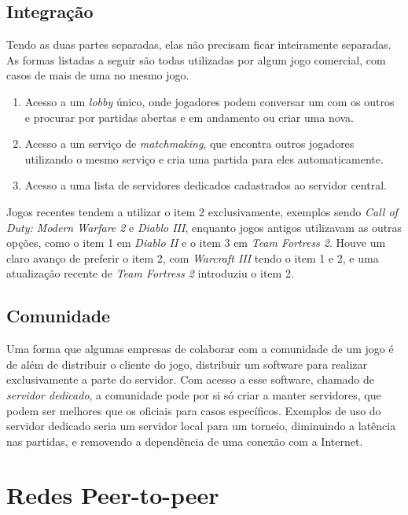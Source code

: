   \subsection{Integração}
    Tendo as duas partes separadas, elas não precisam ficar inteiramente separadas. As formas
    listadas a seguir são todas utilizadas por algum jogo comercial, com casos de mais de uma no
    mesmo jogo.
    
    \begin{enumerate}
      \item Acesso a um \textit{lobby} único, onde jogadores podem conversar um com os outros e
        procurar por partidas abertas e em andamento ou criar uma nova.
      \item Acesso a um serviço de \textit{matchmaking}, que encontra outros jogadores utilizando
        o mesmo serviço e cria uma partida para eles automaticamente.
      \item Acesso a uma lista de servidores dedicados cadastrados ao servidor central.
    \end{enumerate}
    
    Jogos recentes tendem a utilizar o item 2 exclusivamente, exemplos sendo \textit{Call of Duty:
    Modern Warfare 2} e \textit{Diablo III}, enquanto jogos antigos utilizavam as outras opções,
    como o item 1 em \textit{Diablo II} e o item 3 em \textit{Team Fortress 2}. Houve um claro
    avanço de preferir o item 2, com \textit{Warcraft III} tendo o item 1 e 2, e uma atualização
    recente de \textit{Team Fortress 2} introduziu o item 2.
    
  \subsection{Comunidade}
    Uma forma que algumas empresas de colaborar com a comunidade de um jogo é de além de
    distribuir o cliente do jogo, distribuir um software para realizar exclusivamente a parte
    do servidor. Com acesso a esse software, chamado de \textit{servidor dedicado}, a comunidade
    pode por si só criar a manter servidores, que podem ser melhores que os oficiais para casos
    específicos. Exemplos de uso do servidor dedicado seria um servidor local para um torneio, 
    diminuindo a latência nas partidas, e removendo a dependência de uma conexão com a Internet.

\section{Redes Peer-to-peer}
\label{sec:conceitos:redes}

